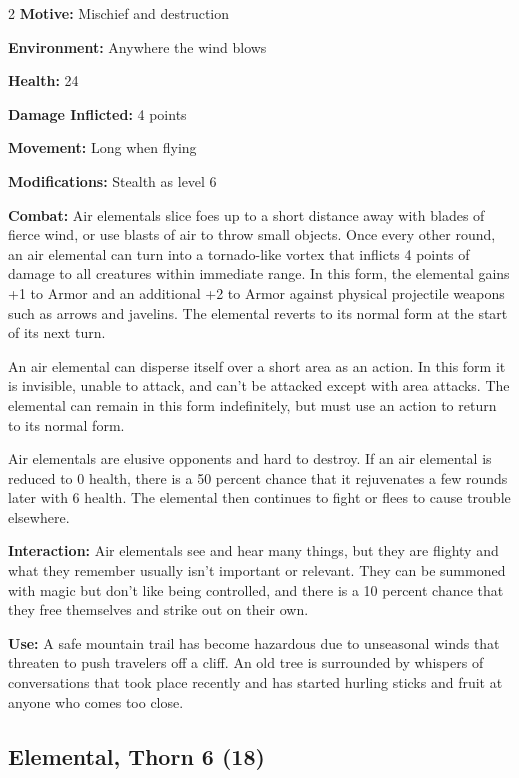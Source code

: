 \begin{multicols}{2}
\textbf{Motive:} Mischief and destruction 

\textbf{Environment:} Anywhere the wind blows 

\textbf{Health:} 24 

\textbf{Damage Inflicted:} 4 points 

\textbf{Movement:} Long when flying 

\textbf{Modifications:} Stealth as level 6 

\textbf{Combat:} Air elementals slice foes up to a short distance away with blades of fierce wind, or use blasts of air to throw small objects. Once every other round, an air elemental can turn into a tornado-like vortex that inflicts 4 points of damage to all creatures within immediate range. In this form, the elemental gains +1 to Armor and an additional +2 to Armor against physical projectile weapons such as arrows and javelins. The elemental reverts to its normal form at the start of its next turn. 

An air elemental can disperse itself over a short area as an action. In this form it is invisible, unable to attack, and can’t be attacked except with area attacks. The elemental can remain in this form indefinitely, but must use an action to return to its normal form. 

Air elementals are elusive opponents and hard to destroy. If an air elemental is reduced to 0 health, there is a 50 percent chance that it rejuvenates a few rounds later with 6 health. The elemental then continues to fight or flees to cause trouble elsewhere. 

\textbf{Interaction:} Air elementals see and hear many things, but they are flighty and what they remember usually isn’t important or relevant. They can be summoned with magic but don’t like being controlled, and there is a 10 percent chance that they free themselves and strike out on their own. 

\textbf{Use:} A safe mountain trail has become hazardous due to unseasonal winds that threaten to push travelers off a cliff. An old tree is surrounded by whispers of conversations that took place recently and has started hurling sticks and fruit at anyone who comes too close.

\subsection{Elemental, Thorn 6 (18)}


\end{multicols}
